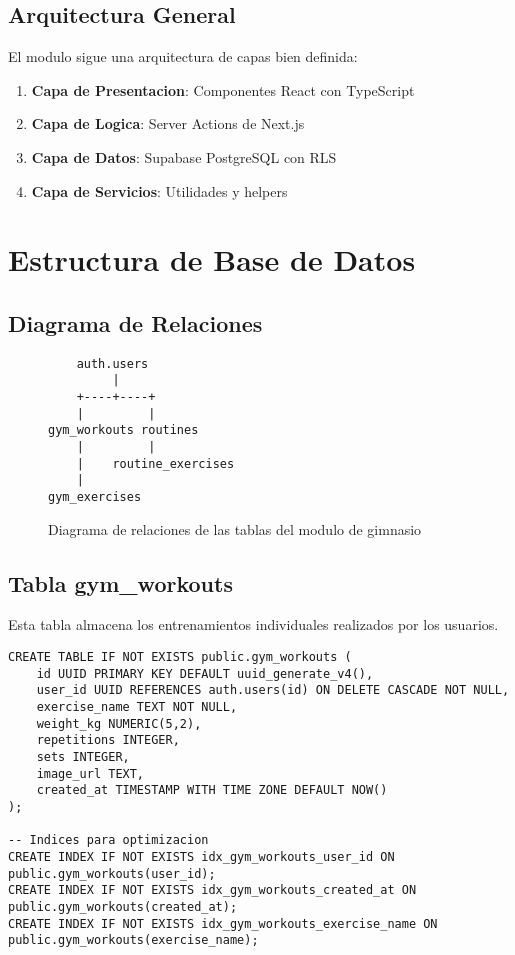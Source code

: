 \documentclass[12pt,a4paper]{article}
\begin{document}
\subsection{Arquitectura General}

El modulo sigue una arquitectura de capas bien definida:

\begin{enumerate}
    \item \textbf{Capa de Presentacion}: Componentes React con TypeScript
    \item \textbf{Capa de Logica}: Server Actions de Next.js
    \item \textbf{Capa de Datos}: Supabase PostgreSQL con RLS
    \item \textbf{Capa de Servicios}: Utilidades y helpers
\end{enumerate}

\section{Estructura de Base de Datos}

\subsection{Diagrama de Relaciones}

\begin{figure}[H]
\centering
\begin{verbatim}
    auth.users
         |
    +----+----+
    |         |
gym_workouts routines
    |         |
    |    routine_exercises
    |
gym_exercises
\end{verbatim}
\caption{Diagrama de relaciones de las tablas del modulo de gimnasio}
\end{figure}

\subsection{Tabla gym\_workouts}

Esta tabla almacena los entrenamientos individuales realizados por los usuarios.

\begin{lstlisting}[style=sqlstyle, caption=Estructura completa de gym_workouts]
CREATE TABLE IF NOT EXISTS public.gym_workouts (
    id UUID PRIMARY KEY DEFAULT uuid_generate_v4(),
    user_id UUID REFERENCES auth.users(id) ON DELETE CASCADE NOT NULL,
    exercise_name TEXT NOT NULL,
    weight_kg NUMERIC(5,2),
    repetitions INTEGER,
    sets INTEGER,
    image_url TEXT,
    created_at TIMESTAMP WITH TIME ZONE DEFAULT NOW()
);

-- Indices para optimizacion
CREATE INDEX IF NOT EXISTS idx_gym_workouts_user_id ON public.gym_workouts(user_id);
CREATE INDEX IF NOT EXISTS idx_gym_workouts_created_at ON public.gym_workouts(created_at);
CREATE INDEX IF NOT EXISTS idx_gym_workouts_exercise_name ON public.gym_workouts(exercise_name);
\end{lstlisting}
\end{document}
